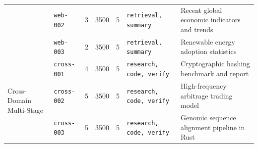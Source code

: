 \begin{table}[!t]
\begin{tabular}{llccclp{4.5cm}}
& \texttt{web-002} & 3 & 3500 & 5 & \texttt{retrieval, summary} & Recent global economic indicators and trends \\
& \texttt{web-003} & 2 & 3500 & 5 & \texttt{retrieval, summary} & Renewable energy adoption statistics \\
\midrule
\multirow{3}{*}{Cross-Domain Multi-Stage} 
& \texttt{cross-001} & 4 & 3500 & 5 & \texttt{research, code, verify} & Cryptographic hashing benchmark and report \\
& \texttt{cross-002} & 5 & 3500 & 5 & \texttt{research, code, verify} & High-frequency arbitrage trading model \\
& \texttt{cross-003} & 5 & 3500 & 5 & \texttt{research, code, verify} & Genomic sequence alignment pipeline in Rust \\
\bottomrule
\end{tabular}
\end{table}
